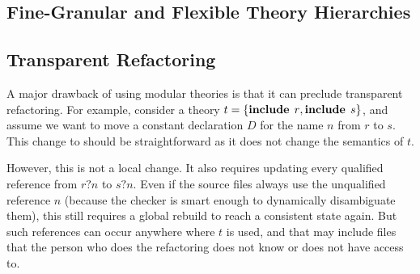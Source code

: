 \subsection{Fine-Granular and Flexible Theory Hierarchies}


\subsection{Transparent Refactoring}

A major drawback of using modular theories is that it can preclude transparent refactoring.
For example, consider a theory $t=\{\operatorname{\mathbf{include}}{\;r},\operatorname{\mathbf{include}}{\;s}\}$, and assume we want to move a constant declaration $D$ for the name $n$ from $r$ to $s$.
This change to should be straightforward as it does not change the semantics of $t$.

However, this is not a local change.
It also requires updating every qualified reference from $r?n$ to $s?n$.
Even if the source files always use the unqualified reference $n$ (because the checker is smart enough to dynamically disambiguate them), this still requires a global rebuild to reach a consistent state again.
But such references can occur anywhere where $t$ is used, and that may include files that the person who does the refactoring does not know or does not have access to.

